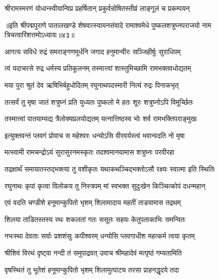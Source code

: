 \twolineshloka
{श्रीरामस्मरणं योधान्स्वीयान्विप्र प्रहर्षितान्}
{प्रकुर्वन्रोषितस्तीव्रं लाङ्गूलं च प्रकम्पयन्}%

॥इति श्रीपद्मपुराणे पातालखण्डे शेषवात्स्यायनसंवादे रामाश्वमेधे पुष्कलशत्रुघ्नपराजयो नाम त्रिचत्वारिंशत्तमोऽध्यायः॥४३॥



\twolineshloka
{आगत्य सविधे रुद्रं समराङ्गणमूर्धनि}
{जगाद हनुमान्वीरः सञ्जिहीर्षुः सुराधिपम्}%


\twolineshloka
{त्वं यदाचरसे रुद्र धर्मस्य प्रतिकूलनम्}
{तस्मात्त्वां शास्तुमिच्छामि रामभक्तवधोद्यतम्}%

\twolineshloka
{मया पुरा श्रुतं देव ऋषिभिर्बहुधोदितम्}
{रघुनाथपदस्मारी नित्यं रुद्रः पिनाकभृत्}%

\twolineshloka
{तत्सर्वं तु मृषा जातं शत्रुघ्नं प्रति युध्यतः}
{पुष्कलो मे हतः शूरः शत्रुघ्नोऽपि विमूर्च्छितः}%

\twolineshloka
{तस्मात्त्वां पातयाम्यद्य त्रैलोक्यप्रलयोद्यतम्}
{यत्नात्तिष्ठस्व भोः शर्व रामभक्तिपराङ्मुखः}%


\twolineshloka
{इत्युक्तवन्तं प्लवगं प्रोवाच स महेश्वरः}
{धन्योऽसि वीरवर्यस्त्वं भवान्वदति नो मृषा}%

\twolineshloka
{मत्स्वामी रामचन्द्रोऽयं सुरासुरनमस्कृतः}
{तदश्वमानयामास शत्रुघ्नः परवीरहा}%

\twolineshloka
{तद्रक्षार्थं समायातस्तद्भक्त्या तु वशीकृतः}
{यथाकथञ्चिद्भक्तोऽसौ रक्ष्यः स्वात्मा इति स्थितिः}%

\twolineshloka
{रघुनाथः कृपां कृत्वा विलोकय तु निस्त्रपम्}
{मां स्वभक्त सुदुःखेन किञ्चित्कोपं दधन्महान्}%


\twolineshloka
{एवं वदति चण्डीशे हनूमान्कुपितो भृशम्}
{शिलामादाय महतीं ताडयामास तद्रथम्}%

\twolineshloka
{शिलया ताडितस्तस्य रथः शकलतां गतः}
{ससूतः सहयः केतुपताकाभिः समन्वितः}%

\twolineshloka
{नभःस्था देवताः सर्वाः प्रशशंसुः कपीश्वरम्}
{धन्योसि प्लवगाधीश महत्कर्म त्वया कृतम्}%

\twolineshloka
{श्रीशिवं विरथं दृष्ट्वा नन्दी तं समुपाद्रवत्}
{उवाच श्रीमहादेवं मत्पृष्ठं गम्यतामिति}%

\twolineshloka
{वृषस्थितं तु भूतेशं हनूमान्कुपितो भृशम्}
{शिलामुत्पाट्य तरसा प्राहनद्धृदये तदा}%

